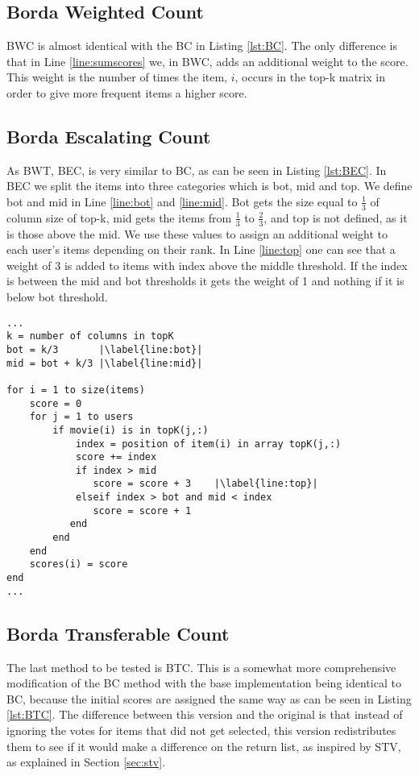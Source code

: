 \subsection{Borda Weighted Count}
BWC is almost identical with the BC in Listing \ref{lst:BC}. The only difference is that in Line \ref{line:sumscores} we, in BWC, adds an additional weight to the score. This weight is the number of times the item, $i$, occurs in the top-k matrix in order to give more frequent items a higher score.

\subsection{Borda Escalating Count}
As BWT, BEC, is very similar to BC, as can be seen in Listing \ref{lst:BEC}. In BEC we split the items into three categories which is bot, mid and top. We define bot and mid in Line \ref{line:bot} and \ref{line:mid}. Bot gets the size equal to $\frac{1}{3}$ of column size of top-k, mid gets the items from $\frac{1}{3}$ to $\frac{2}{3}$, and top is not defined, as it is those above the mid. We use these values to assign an additional weight to each user's items depending on their rank. In Line \ref{line:top} one can see that a weight of 3 is added to items with index above the middle threshold. If the index is between the mid and bot thresholds it gets the weight of 1 and nothing if it is below bot threshold.
\begin{lstlisting}[caption={Borda Escalating Count implementation},label=lst:BEC, firstnumber=7,escapechar=|]
...
k = number of columns in topK
bot = k/3 		|\label{line:bot}|
mid = bot + k/3	|\label{line:mid}|

for i = 1 to size(items)
	score = 0
	for j = 1 to users
		if movie(i) is in topK(j,:)
			index = position of item(i) in array topK(j,:)
			score += index
			if index > mid			
               score = score + 3	|\label{line:top}|
           	elseif index > bot and mid < index
               score = score + 1
           end 
		end
	end
	scores(i) = score
end
...
\end{lstlisting}

\subsection{Borda Transferable Count} \label{sec:BTC}
The last method to be tested is BTC. This is a somewhat more comprehensive modification of the BC method with the base implementation being identical to BC, because the initial scores are assigned the same way as can be seen in Listing \ref{lst:BTC}. The difference between this version and the original is that instead of ignoring the votes for items that did not get selected, this version redistributes them to see if it would make a difference on the return list, as inspired by STV, as explained in Section \ref{sec:stv}.

